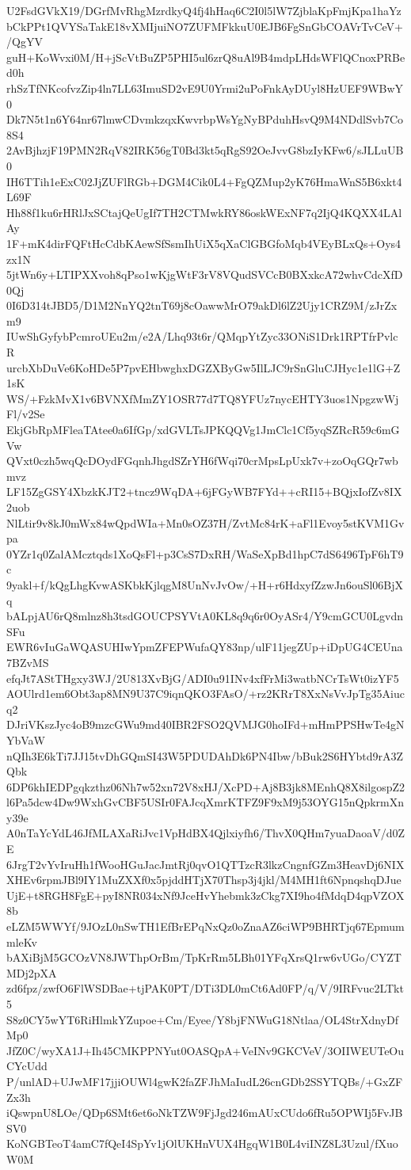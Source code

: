 U2FsdGVkX19/DGrfMvRhgMzrdkyQ4fj4hHaq6C2I0l5lW7ZjblaKpFmjKpa1haYz
bCkPPt1QVYSaTakE18vXMIjuiNO7ZUFMFkkuU0EJB6FgSnGbCOAVrTvCeV+/QgYV
guH+KoWvxi0M/H+jScVtBuZP5PHI5ul6zrQ8uAl9B4mdpLHdsWFlQCnoxPRBed0h
rhSzTfNKcofvzZip4ln7LL63ImuSD2vE9U0Yrmi2uPoFnkAyDUyl8HzUEF9WBwY0
Dk7N5t1n6Y64nr67lmwCDvmkzqxKwvrbpWsYgNyBPduhHsvQ9M4NDdlSvb7Co8S4
2AvBjhzjF19PMN2RqV82IRK56gT0Bd3kt5qRgS92OeJvvG8bzIyKFw6/sJLLuUB0
IH6TTih1eExC02JjZUFlRGb+DGM4Cik0L4+FgQZMup2yK76HmaWnS5B6xkt4L69F
Hh88f1ku6rHRlJxSCtajQeUgIf7TH2CTMwkRY86oskWExNF7q2IjQ4KQXX4LAlAy
1F+mK4dirFQFtHcCdbKAewSfSsmIhUiX5qXaClGBGfoMqb4VEyBLxQs+Oys4zx1N
5jtWn6y+LTIPXXvoh8qPso1wKjgWtF3rV8VQudSVCcB0BXxkcA72whvCdcXfD0Qj
0I6D314tJBD5/D1M2NnYQ2tnT69j8cOawwMrO79akDl6lZ2Ujy1CRZ9M/zJrZxm9
IUwShGyfybPcmroUEu2m/e2A/Lhq93t6r/QMqpYtZyc33ONiS1Drk1RPTfrPvlcR
urcbXbDuVe6KoHDe5P7pvEHbwghxDGZXByGw5IlLJC9rSnGluCJHyc1e1lG+Z1sK
WS/+FzkMvX1v6BVNXfMmZY1OSR77d7TQ8YFUz7nycEHTY3uos1NpgzwWjFl/v2Se
EkjGbRpMFleaTAtee0a6IfGp/xdGVLTsJPKQQVg1JmClc1Cf5yqSZRcR59c6mGVw
QVxt0czh5wqQcDOydFGqnhJhgdSZrYH6fWqi70crMpsLpUxk7v+zoOqGQr7wbmvz
LF15ZgGSY4XbzkKJT2+tncz9WqDA+6jFGyWB7FYd++cRI15+BQjxIofZv8IX2uob
NlLtir9v8kJ0mWx84wQpdWIa+Mn0sOZ37H/ZvtMc84rK+aFl1Evoy5stKVM1Gvpa
0YZr1q0ZalAMcztqds1XoQsFl+p3CsS7DxRH/WaSeXpBd1hpC7dS6496TpF6hT9c
9yakl+f/kQgLhgKvwASKbkKjlqgM8UnNvJvOw/+H+r6HdxyfZzwJn6ouSl06BjXq
bALpjAU6rQ8mlnz8h3tsdGOUCPSYVtA0KL8q9q6r0OyASr4/Y9cmGCU0LgvdnSFu
EWR6vIuGaWQASUHIwYpmZFEPWufaQY83np/ulF11jegZUp+iDpUG4CEUna7BZvMS
efqJt7AStTHgxy3WJ/2U813XvBjG/ADI0u91INv4xfFrMi3watbNCrTsWt0izYF5
AOUlrd1em6Obt3ap8MN9U37C9iqnQKO3FAsO/+rz2KRrT8XxNsVvJpTg35Aiucq2
DJriVKszJyc4oB9mzcGWu9md40IBR2FSO2QVMJG0hoIFd+mHmPPSHwTe4gNYbVaW
nQIh3E6kTi7JJ15tvDhGQmSI43W5PDUDAhDk6PN4Ibw/bBuk2S6HYbtd9rA3ZQbk
6DP6khIEDPgqkzthz06Nh7w52xn72V8xHJ/XcPD+Aj8B3jk8MEnhQ8X8ilgospZ2
l6Pa5dcw4Dw9WxhGvCBF5USIr0FAJcqXmrKTFZ9F9xM9j53OYG15nQpkrmXny39e
A0nTaYcYdL46JfMLAXaRiJvc1VpHdBX4Qjlxiyfh6/ThvX0QHm7yuaDaoaV/d0ZE
6JrgT2vYvIruHh1fWooHGuJacJmtRj0qvO1QTTzcR3lkzCngnfGZm3HeavDj6NIX
XHEv6rpmJBl9IY1MuZXXf0x5pjddHTjX70Thsp3j4jkl/M4MH1ft6NpnqshqDJue
UjE+t8RGH8FgE+pyI8NR034xNf9JceHvYhebmk3zCkg7XI9ho4fMdqD4qpVZOX8b
eLZM5WWYf/9JOzL0nSwTH1EfBrEPqNxQz0oZnaAZ6ciWP9BHRTjq67EpmummleKv
bAXiBjM5GCOzVN8JWThpOrBm/TpKrRm5LBh01YFqXrsQ1rw6vUGo/CYZTMDj2pXA
zd6fpz/zwfO6FlWSDBae+tjPAK0PT/DTi3DL0mCt6Ad0FP/q/V/9IRFvuc2LTkt5
S8z0CY5wYT6RiHlmkYZupoe+Cm/Eyee/Y8bjFNWuG18Ntlaa/OL4StrXdnyDfMp0
JfZ0C/wyXA1J+Ih45CMKPPNYut0OASQpA+VeINv9GKCVeV/3OIIWEUTeOuCYcUdd
P/unlAD+UJwMF17jjiOUWl4gwK2faZFJhMaIudL26cnGDb2SSYTQBs/+GxZFZx3h
iQswpnU8LOe/QDp6SMt6et6oNkTZW9FjJgd246mAUxCUdo6fRu5OPWIj5FvJBSV0
KoNGBTeoT4amC7fQeI4SpYv1jOlUKHnVUX4HgqW1B0L4viINZ8L3Uzul/fXuoW0M
